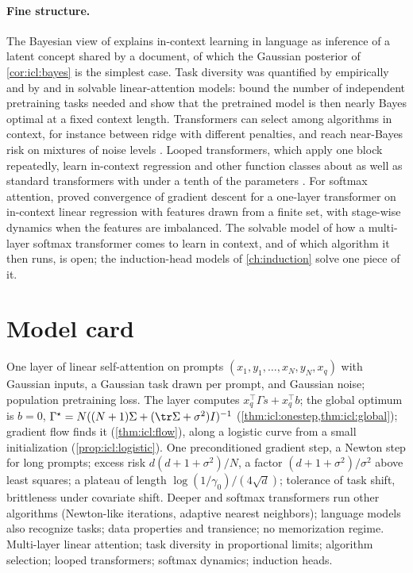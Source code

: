 \begin{refsection}
\paragraph{Fine structure.} The Bayesian view of \textcite{XieEtAl2022} explains in-context learning in language as inference of a latent concept shared by a document, of which the Gaussian posterior of \cref{cor:icl:bayes} is the simplest case. Task diversity was quantified by \textcite{RaventosEtAl2023} empirically and by \textcite{WuEtAl2024} and \textcite{LuEtAl2025} in solvable linear-attention models: \textcite{WuEtAl2024} bound the number of independent pretraining tasks needed and show that the pretrained model is then nearly Bayes optimal at a fixed context length. Transformers can select among algorithms in context, for instance between ridge with different penalties, and reach near-Bayes risk on mixtures of noise levels \parencite{BaiEtAl2023}. Looped transformers, which apply one block repeatedly, learn in-context regression and other function classes about as well as standard transformers with under a tenth of the parameters \parencite{YangEtAl2024}. For softmax attention, \textcite{HuangChengLiang2024} proved convergence of gradient descent for a one-layer transformer on in-context linear regression with features drawn from a finite set, with stage-wise dynamics when the features are imbalanced. The solvable model of how a multi-layer softmax transformer comes to learn in context, and of which algorithm it then runs, is open; the induction-head models of \cref{ch:induction} solve one piece of it.

\section{Model card}\label{sec:icl:card}

{One layer of linear self-attention on prompts $(x_1,y_1,\dots,x_N,y_N,x_q)$ with Gaussian inputs, a Gaussian task drawn per prompt, and Gaussian noise; population pretraining loss.}
{The layer computes $x_q^\top\Gamma s+x_q^\top b$; the global optimum is $b=0$, $\Gamma^\star=N((N+1)\Sigma+(\tr\Sigma+\sigma^2)I)^{-1}$ (\cref{thm:icl:onestep,thm:icl:global}); gradient flow finds it (\cref{thm:icl:flow}), along a logistic curve from a small initialization (\cref{prop:icl:logistic}).}
{One preconditioned gradient step, a Newton step for long prompts; excess risk $d(d+1+\sigma^2)/N$, a factor $(d+1+\sigma^2)/\sigma^2$ above least squares; a plateau of length $\log(1/\gamma_0)/(4\sqrt d)$; tolerance of task shift, brittleness under covariate shift.}
{Deeper and softmax transformers run other algorithms (Newton-like iterations, adaptive nearest neighbors); language models also recognize tasks; data properties and transience; no memorization regime.}
{Multi-layer linear attention; task diversity in proportional limits; algorithm selection; looped transformers; softmax dynamics; induction heads.}


\end{refsection}
